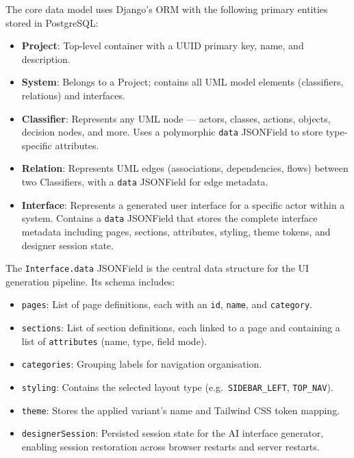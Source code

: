 The core data model uses Django's ORM with the following primary entities stored in PostgreSQL:

\begin{itemize}
    \item \textbf{Project}: Top-level container with a UUID primary key, name, and description.
    \item \textbf{System}: Belongs to a Project; contains all UML model elements (classifiers, relations) and interfaces.
    \item \textbf{Classifier}: Represents any UML node — actors, classes, actions, objects, decision nodes, and more. Uses a polymorphic \texttt{data} JSONField to store type-specific attributes.
    \item \textbf{Relation}: Represents UML edges (associations, dependencies, flows) between two Classifiers, with a \texttt{data} JSONField for edge metadata.
    \item \textbf{Interface}: Represents a generated user interface for a specific actor within a system. Contains a \texttt{data} JSONField that stores the complete interface metadata including pages, sections, attributes, styling, theme tokens, and designer session state.
\end{itemize}

The \texttt{Interface.data} JSONField is the central data structure for the UI generation pipeline. Its schema includes:

\begin{itemize}
    \item \texttt{pages}: List of page definitions, each with an \texttt{id}, \texttt{name}, and \texttt{category}.
    \item \texttt{sections}: List of section definitions, each linked to a page and containing a list of \texttt{attributes} (name, type, field mode).
    \item \texttt{categories}: Grouping labels for navigation organisation.
    \item \texttt{styling}: Contains the selected layout type (e.g.\ \texttt{SIDEBAR\_LEFT}, \texttt{TOP\_NAV}).
    \item \texttt{theme}: Stores the applied variant's name and Tailwind CSS token mapping.
    \item \texttt{designerSession}: Persisted session state for the AI interface generator, enabling session restoration across browser restarts and server restarts.
\end{itemize}


